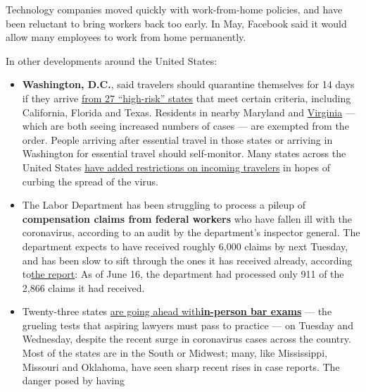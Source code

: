 Technology companies moved quickly with work-from-home policies, and
have been reluctant to bring workers back too early. In May, Facebook
said it would allow many employees to work from home permanently.

In other developments around the United States:

\begin{itemize}
\item
  \textbf{Washington, D.C.}, said travelers should quarantine themselves
  for 14 days if they arrive
  \href{https://coronavirus.dc.gov/release/dc-health-releases-list-high-risk-states}{from
  27 ``high-risk'' states} that meet certain criteria, including
  California, Florida and Texas. Residents in nearby Maryland and
  \href{https://www.nytimes3xbfgragh.onion/interactive/2020/us/virginia-coronavirus-cases.html}{Virginia}
  --- which are both seeing increased numbers of cases --- are exempted
  from the order. People arriving after essential travel in those states
  or arriving in Washington for essential travel should self-monitor.
  Many states across the United States
  \href{https://www.nytimes3xbfgragh.onion/2020/07/10/travel/state-travel-restrictions.html}{have
  added restrictions on incoming travelers} in hopes of curbing the
  spread of the virus.
\item
  The Labor Department has been struggling to process a pileup of
  \textbf{compensation claims from federal workers} who have fallen ill
  with the coronavirus, according to an audit by the department's
  inspector general. The department expects to have received roughly
  6,000 claims by next Tuesday, and has been slow to sift through the
  ones it has received already, according
  to\href{https://www.oig.dol.gov/public/reports/oa/2020/19-20-004-04-001.pdf}{the
  report}: As of June 16, the department had processed only 911 of the
  2,866 claims it had received.
\item
  Twenty-three states
  \href{http://www.ncbex.org/ncbe-covid-19-updates/july-2020-bar-exam-jurisdiction-information/status-table/}{are
  going ahead
  with}\textbf{\href{http://www.ncbex.org/ncbe-covid-19-updates/july-2020-bar-exam-jurisdiction-information/status-table/}{in-person
  bar exams}} --- the grueling tests that aspiring lawyers must pass to
  practice --- on Tuesday and Wednesday, despite the recent surge in
  coronavirus cases across the country. Most of the states are in the
  South or Midwest; many, like Mississippi, Missouri and Oklahoma, have
  seen sharp recent rises in case reports. The danger posed by having

\end{itemize}
